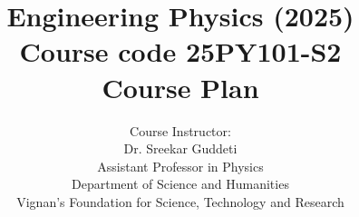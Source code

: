 \documentclass{beamer}
\title[Engineering Physics]{Engineering Physics (2025) \\ Course code
	25PY101-S2	\\ Course Plan}
\author{Course Instructor:\\ 
	{\color{VignanBlue} Dr. Sreekar Guddeti}\\
	Assistant Professor in Physics\\
	Department of Science and Humanities \\
	{\color{VignanRed}Vignan's Foundation for Science, Technology and Research}
}
\begin{document}
	\frame{\titlepage}
	
\end{document}
